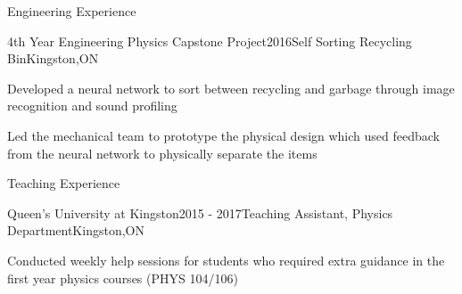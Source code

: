 \documentclass{resume2} %
\begin{document}
\begin{rSection}{Engineering Experience}
	
	\begin{rSubsection}{4th Year Engineering Physics Capstone Project}{2016}{Self Sorting Recycling Bin}{Kingston,ON}
		\item Developed a neural network to sort between recycling and garbage through image recognition and sound profiling
		\item Led the mechanical team to prototype the physical design which used feedback from the neural network to physically separate the items 
	\end{rSubsection}
\iffalse
	\begin{rSubsection}{Engineering Physics Design Project}{2015}{Photodiode Research Sensor}{}
		\item Designed and fabricated a research sensor used to assess the properties of photodiodes. Information gathered included efficiency, current and voltage under illuminated and darkened conditions using an Arduino, Matlab and LabVIEW
	\end{rSubsection}

	\begin{rSubsection}{Engineering Design and Practice II}{2014}{Nuclear Waste Gamma Radiation Detector}{Kingston,ON}
		\item Prototyped a Nuclear Waste Gamma Radiation Detector. Through the process of material selection and decision making, the final product was designed for use in areas surrounding the Deep Geologic Repository in Ontario
	\end{rSubsection}

	\begin{rSubsection}{Wirecard AG}{Summer 2014}{Summer Technology Intern}{Singapore}
	\item Redesigned Wirecard's payment processing webpage using HTML and CSS
	\item It is currently used for redirecting online payments to Wirecard's payment processing service	
	\end{rSubsection}
\fi
\end{rSection}

\begin{rSection}{Teaching Experience}
	
	\begin{rSubsection}{Queen's University at Kingston}{2015 - 2017}{Teaching Assistant, Physics Department}{Kingston,ON}
		\item Conducted weekly help sessions for students who required extra guidance in the first year physics courses (PHYS 104/106)
	\end{rSubsection}

\end{rSection}
\end{document}
